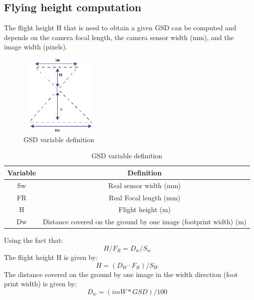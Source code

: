 \subsection{Flying height computation}
The flight height H that is need to obtain a given GSD can be computed and depends on the camera focal length, the camera sensor width  (mm), and the image width (pixels).\cite{GSDComputation}
\begin{figure}[H]
\centering
\includegraphics[width=4cm,height=4cm,keepaspectratio]{imagenes/GSD_Varaible.png}
\caption{GSD variable definition}
\label{fig:GSD}
\end{figure}
\begin{table}[H]
\centering
\begin{tabular}{|c|c|}
\hline
\textbf{Variable} & \textbf{Definition}                                                                      \\ \hline
Sw                & Real sensor width (mm)                                                                   \\ \hline
FR                & Real Focal length (mm)                                                                   \\ \hline
H                 & Flight height (m)                                                                        \\ \hline
Dw                & Distance covered on the ground by one image (footprint width) (m) \\ \hline
\end{tabular}
\caption{GSD variable definition}
\end{table}
Using the fact that:
\begin{equation}
H/F_{R} = D_{w}/S_{w}
\end{equation}
The flight height H is given by:
\begin{equation}
H = (D_{W}\cdot F_{R})/S_{W}
\label{H}
\end{equation}
The distance covered on the ground by one image in the width direction (foot print width) is given by:
\begin{equation}
D_{w}=(imW*GSD)/100
\label{DW}
\end{equation}
